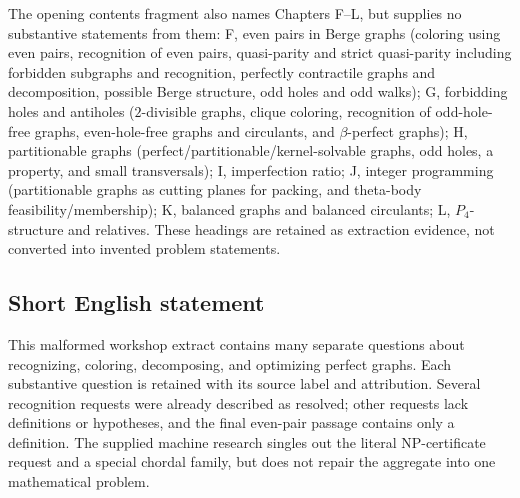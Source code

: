 \documentclass[11pt]{article}
\begin{document}
The opening contents fragment also names Chapters F--L, but supplies no substantive statements from them: F, even pairs in Berge graphs (coloring using even pairs, recognition of even pairs, quasi-parity and strict quasi-parity including forbidden subgraphs and recognition, perfectly contractile graphs and decomposition, possible Berge structure, odd holes and odd walks); G, forbidding holes and antiholes ($2$-divisible graphs, clique coloring, recognition of odd-hole-free graphs, even-hole-free graphs and circulants, and $\beta$-perfect graphs); H, partitionable graphs (perfect/partitionable/kernel-solvable graphs, odd holes, a property, and small transversals); I, imperfection ratio; J, integer programming (partitionable graphs as cutting planes for packing, and theta-body feasibility/membership); K, balanced graphs and balanced circulants; L, $P_4$-structure and relatives. These headings are retained as extraction evidence, not converted into invented problem statements.
\subsection{Short English statement}
This malformed workshop extract contains many separate questions about recognizing, coloring, decomposing, and optimizing perfect graphs. Each substantive question is retained with its source label and attribution. Several recognition requests were already described as resolved; other requests lack definitions or hypotheses, and the final even-pair passage contains only a definition. The supplied machine research singles out the literal NP-certificate request and a special chordal family, but does not repair the aggregate into one mathematical problem.
\end{document}
